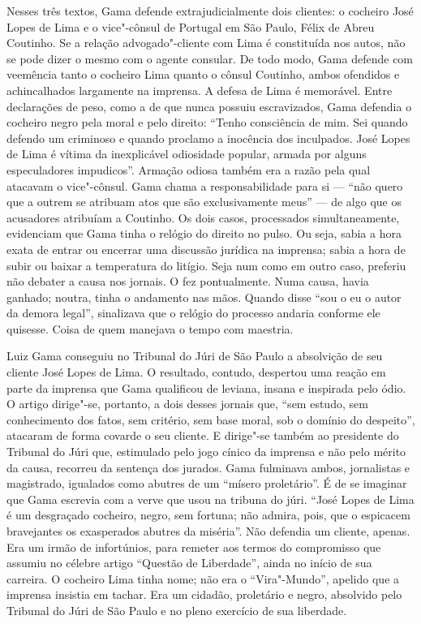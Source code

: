 {\small\noindent
Nesses três textos, Gama defende extrajudicialmente dois clientes:
o cocheiro José Lopes de Lima e o vice"-cônsul de Portugal em São Paulo,
Félix de Abreu Coutinho. Se a relação advogado"-cliente com Lima é
constituída nos autos, não se pode dizer o mesmo com o agente
consular. De todo modo, Gama defende com veemência tanto o cocheiro Lima
quanto o cônsul Coutinho, ambos ofendidos e achincalhados largamente na
imprensa. A defesa de Lima é memorável. Entre declarações de peso, como
a de que nunca possuiu escravizados, Gama defendia o cocheiro negro pela
moral e pelo direito: ``Tenho consciência de mim. Sei quando defendo um
criminoso e quando proclamo a inocência dos inculpados. José Lopes de
Lima é vítima da inexplicável odiosidade popular, armada por alguns
especuladores impudicos''. Armação odiosa também era a razão pela qual
atacavam o vice"-cônsul. Gama chama a responsabilidade para si --- ``não
quero que a outrem se atribuam atos que são exclusivamente meus'' --- de
algo que os acusadores atribuíam a Coutinho. Os dois casos, processados
simultaneamente, evidenciam que Gama tinha o relógio do direito no
pulso. Ou seja, sabia a hora exata de entrar ou encerrar uma discussão
jurídica na imprensa; sabia a hora de subir ou baixar a temperatura do
litígio. Seja num como em outro caso, preferiu não debater a causa nos
jornais. O fez pontualmente. Numa causa, havia ganhado; noutra, tinha o
andamento nas mãos. Quando disse ``sou o eu o autor da demora legal'',
sinalizava que o relógio do processo andaria conforme ele quisesse.
Coisa de quem manejava o tempo com maestria. }
\@openrighttrue\makeatother \endgroup


\paginabranca
\mbox{}\vfill
\thispagestyle{empty}

{\small\noindent
Luiz Gama conseguiu no Tribunal
do Júri de São Paulo a absolvição de seu cliente José Lopes de Lima. O
resultado, contudo, despertou uma reação em parte da imprensa que Gama
qualificou de leviana, insana e inspirada pelo ódio. O artigo dirige"-se,
portanto, a dois desses jornais que, ``sem estudo, sem conhecimento dos
fatos, sem critério, sem base moral, sob o domínio do despeito'',
atacaram de forma covarde o seu cliente. E dirige"-se também ao presidente do
Tribunal do Júri que, estimulado pelo jogo cínico da imprensa e não pelo
mérito da causa, recorreu da sentença dos jurados. Gama fulminava ambos,
jornalistas e magistrado, igualados como abutres de um ``mísero
proletário''. É de se imaginar que Gama escrevia com a verve que usou na
tribuna do júri. ``José Lopes de Lima é um desgraçado cocheiro, negro,
sem fortuna; não admira, pois, que o espicacem bravejantes os
exasperados abutres da miséria''. Não defendia um cliente, apenas. Era um
irmão de infortúnios, para remeter aos termos do compromisso que assumiu
no célebre artigo ``Questão de Liberdade'', ainda no início de sua
carreira. O cocheiro Lima tinha nome; não era o ``Vira"-Mundo'', apelido
que a imprensa insistia em tachar. Era um cidadão, proletário e negro,
absolvido pelo Tribunal do Júri de São Paulo e no pleno exercício de sua
liberdade. }

